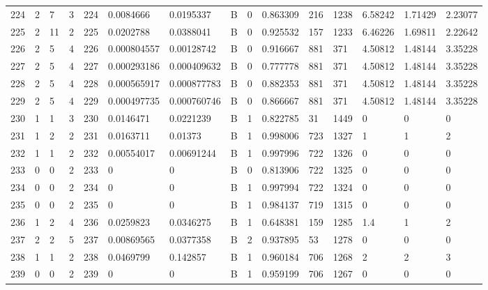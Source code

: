 \begin{latin}
\begin{longtable}{lllllllllllllll}
	224 & 2  & 7   & 3  & 224 & 0.0084666      & 0.0195337      & B & 0  & 0.863309 & 216  & 1238 & 6.58242 & 1.71429 & 2.23077 \\
	225 & 2  & 11  & 2  & 225 & 0.0202788      & 0.0388041      & B & 0  & 0.925532 & 157  & 1233 & 6.46226 & 1.69811 & 2.22642 \\
	226 & 2  & 5   & 4  & 226 & 0.000804557    & 0.00128742     & B & 0  & 0.916667 & 881  & 371  & 4.50812 & 1.48144 & 3.35228 \\
	227 & 2  & 5   & 4  & 227 & 0.000293186    & 0.000409632    & B & 0  & 0.777778 & 881  & 371  & 4.50812 & 1.48144 & 3.35228 \\
	228 & 2  & 5   & 4  & 228 & 0.000565917    & 0.000877783    & B & 0  & 0.882353 & 881  & 371  & 4.50812 & 1.48144 & 3.35228 \\
	229 & 2  & 5   & 4  & 229 & 0.000497735    & 0.000760746    & B & 0  & 0.866667 & 881  & 371  & 4.50812 & 1.48144 & 3.35228 \\
	230 & 1  & 1   & 3  & 230 & 0.0146471      & 0.0221239      & B & 1  & 0.822785 & 31   & 1449 & 0       & 0       & 0       \\
	231 & 1  & 2   & 2  & 231 & 0.0163711      & 0.01373        & B & 1  & 0.998006 & 723  & 1327 & 1       & 1       & 2       \\
	232 & 1  & 1   & 2  & 232 & 0.00554017     & 0.00691244     & B & 1  & 0.997996 & 722  & 1326 & 0       & 0       & 0       \\
	233 & 0  & 0   & 2  & 233 & 0              & 0              & B & 0  & 0.813906 & 722  & 1325 & 0       & 0       & 0       \\
	234 & 0  & 0   & 2  & 234 & 0              & 0              & B & 1  & 0.997994 & 722  & 1324 & 0       & 0       & 0       \\
	235 & 0  & 0   & 2  & 235 & 0              & 0              & B & 1  & 0.984137 & 719  & 1315 & 0       & 0       & 0       \\
	236 & 1  & 2   & 4  & 236 & 0.0259823      & 0.0346275      & B & 1  & 0.648381 & 159  & 1285 & 1.4     & 1       & 2       \\
	237 & 2  & 2   & 5  & 237 & 0.00869565     & 0.0377358      & B & 2  & 0.937895 & 53   & 1278 & 0       & 0       & 0       \\
	238 & 1  & 1   & 2  & 238 & 0.0469799      & 0.142857       & B & 1  & 0.960184 & 706  & 1268 & 2       & 2       & 3       \\
	239 & 0  & 0   & 2  & 239 & 0              & 0              & B & 1  & 0.959199 & 706  & 1267 & 0       & 0       & 0       \\

\end{longtable}
\end{latin}
